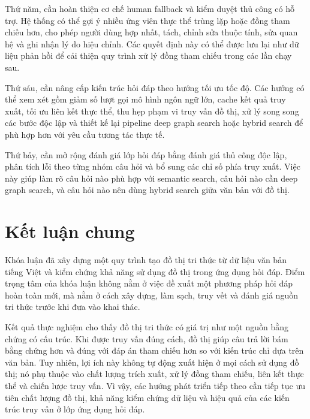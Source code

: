 Thứ năm, cần hoàn thiện cơ chế human fallback và kiểm duyệt thủ công có hỗ trợ. Hệ thống có thể gợi ý nhiều ứng viên thực thể trùng lặp hoặc đồng tham chiếu hơn, cho phép người dùng hợp nhất, tách, chỉnh sửa thuộc tính, sửa quan hệ và ghi nhận lý do hiệu chỉnh. Các quyết định này có thể được lưu lại như dữ liệu phản hồi để cải thiện quy trình xử lý đồng tham chiếu trong các lần chạy sau.

Thứ sáu, cần nâng cấp kiến trúc hỏi đáp theo hướng tối ưu tốc độ. Các hướng có thể xem xét gồm giảm số lượt gọi mô hình ngôn ngữ lớn, cache kết quả truy xuất, tối ưu liên kết thực thể, thu hẹp phạm vi truy vấn đồ thị, xử lý song song các bước độc lập và thiết kế lại pipeline deep graph search hoặc hybrid search để phù hợp hơn với yêu cầu tương tác thực tế.

Thứ bảy, cần mở rộng đánh giá lớp hỏi đáp bằng đánh giá thủ công độc lập, phân tích lỗi theo từng nhóm câu hỏi và bổ sung các chỉ số phía truy xuất. Việc này giúp làm rõ câu hỏi nào phù hợp với semantic search, câu hỏi nào cần deep graph search, và câu hỏi nào nên dùng hybrid search giữa văn bản với đồ thị.

\section{Kết luận chung}

Khóa luận đã xây dựng một quy trình tạo đồ thị tri thức từ dữ liệu văn bản tiếng Việt và kiểm chứng khả năng sử dụng đồ thị trong ứng dụng hỏi đáp. Điểm trọng tâm của khóa luận không nằm ở việc đề xuất một phương pháp hỏi đáp hoàn toàn mới, mà nằm ở cách xây dựng, làm sạch, truy vết và đánh giá nguồn tri thức trước khi đưa vào khai thác.

Kết quả thực nghiệm cho thấy đồ thị tri thức có giá trị như một nguồn bằng chứng có cấu trúc. Khi được truy vấn đúng cách, đồ thị giúp câu trả lời bám bằng chứng hơn và đúng với đáp án tham chiếu hơn so với kiến trúc chỉ dựa trên văn bản. Tuy nhiên, lợi ích này không tự động xuất hiện ở mọi cách sử dụng đồ thị; nó phụ thuộc vào chất lượng trích xuất, xử lý đồng tham chiếu, liên kết thực thể và chiến lược truy vấn. Vì vậy, các hướng phát triển tiếp theo cần tiếp tục ưu tiên chất lượng đồ thị, khả năng kiểm chứng dữ liệu và hiệu quả của các kiến trúc truy vấn ở lớp ứng dụng hỏi đáp.
